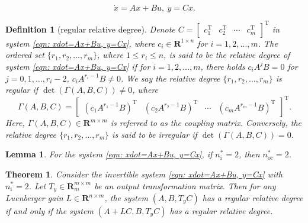 \documentclass[10pt,a4paper]{amsart}
\newtheorem{definition}{Definition}
\newtheorem{lemma}{Lemma}
\newtheorem{theorem}{Theorem}
\newcommand\GAmma{\mathit\Gamma}
\newcommand\nsharp{n_\mathrm i^*}
\newcommand\nocstar{n_\mathrm{oc}^*}
\newcommand\R{\mathbf R}
\newcommand\T{\mathrm T}
\begin{document}
\setcounter{section}{2}
\setcounter{equation}{0}
\setcounter{corollary}{0}
\setcounter{definition}{0}
\setcounter{lemma}{0}
\setcounter{problem}{0}
\setcounter{prop}{0}
\setcounter{remark}{0}
\setcounter{theorem}{0}
\begin{equation}\label{eqn: xdot=Ax+Bu, y=Cx}
\dot x=Ax+Bu,\ y=Cx.
\end{equation}

\setcounter{section}{2}
\setcounter{equation}{1}
\setcounter{corollary}{0}
\setcounter{definition}{0}
\setcounter{lemma}{0}
\setcounter{problem}{0}
\setcounter{prop}{0}
\setcounter{remark}{0}
\setcounter{theorem}{0}
\begin{definition}[regular relative degree]\label{def:rd}
Denote $C=\begin{bmatrix}c_1^\T&c_2^\T&\cdots&c_m^\T\end{bmatrix}^\T$
in system \eqref{eqn: xdot=Ax+Bu, y=Cx},
where $c_i\in\R^{1\times n}$ for $i=1,2,\dots,m$.
The ordered set $\{r_1,r_2,\dots,r_m\}$, where $1\le r_i\le n$,
is said to be the relative degree of system
\eqref{eqn: xdot=Ax+Bu, y=Cx} if for $i=1,2,\dots,m$, there holds
$c_iA^jB=0$ for $j=0,1,\dots,r_i-2$, $c_iA^{r_i-1}B\ne0$.
We say the relative degree $\{r_1,r_2,\dots,r_m\}$ is regular if
$\det(\GAmma(A,B,C))\ne0$, where
\[
\GAmma(A,B,C)=
\begin{bmatrix}
(c_1A^{r_1-1}B)^\T&(c_2A^{r_2-1}B)^\T&\cdots&(c_mA^{r_m-1}B)^\T
\end{bmatrix}^\T.
\]
Here, $\GAmma(A,B,C)\in\R^{m\times m}$ is referred to
as the coupling matrix.
Conversely, the relative degree $\{r_1,r_2,\dots,r_m\}$
is said to be irregular if $\det(\GAmma(A,B,C))=0$.
\end{definition}

\setcounter{section}{3}
\setcounter{equation}{0}
\setcounter{corollary}{0}
\setcounter{definition}{4}
\setcounter{lemma}{6}
\setcounter{problem}{1}
\setcounter{prop}{2}
\setcounter{remark}{4}
\setcounter{theorem}{0}
\begin{lemma}\label{thm: if nsharp=2 then n*=2}
For the system \eqref{eqn: xdot=Ax+Bu, y=Cx},
if $\nsharp=2$, then $\nocstar=2$.
\end{lemma}

\setcounter{section}{3}
\setcounter{equation}{3}
\setcounter{corollary}{0}
\setcounter{definition}{4}
\setcounter{lemma}{7}
\setcounter{problem}{1}
\setcounter{prop}{3}
\setcounter{remark}{4}
\setcounter{theorem}{0}
\begin{theorem}
\label{thm: (A,B,TyC) and (A+LC,B,TyC), Ty the same}
Consider the invertible system \eqref{eqn: xdot=Ax+Bu, y=Cx}
with $\nsharp=2$.
Let $T_y\in\R^{m\times m}_m$ be an output transformation matrix.
Then for any Luenberger gain $L\in\R^{n\times m}$,
the system $(A,B,T_yC)$ has a regular relative degree
if and only if
the system $(A+LC,B,T_yC)$ has a regular relative degree.
\end{theorem}
\end{document}
